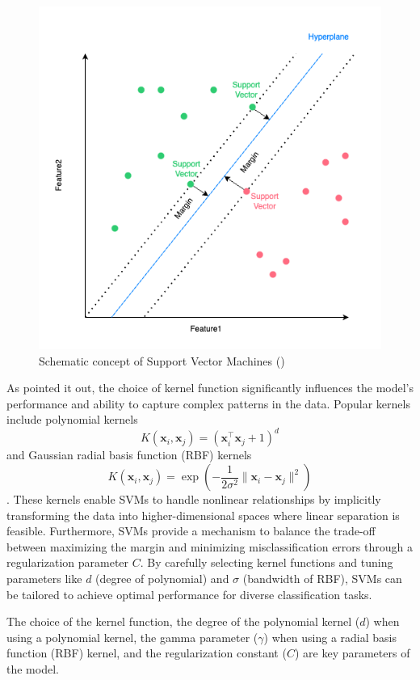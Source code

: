 \documentclass[aodsor,preprint]{imsart}
\numberwithin{equation}{section}
\theoremstyle{plain}
\begin{document}
\begin{figure}[H]
  \centering
  \includegraphics[width=\textwidth]{plots/svm.png}
  \caption{Schematic concept of Support Vector Machines (\cite{james2023})}
  \label{fig:plotsvm}
\end{figure}

As \cite{huang2005} pointed it out, the choice of kernel function significantly influences the model's performance and ability to capture complex patterns in the data. Popular kernels include polynomial kernels $$K(\mathbf{x}_i, \mathbf{x}_j) = (\mathbf{x}_i^\top \mathbf{x}_j + 1)^d$$ and Gaussian radial basis function (RBF) kernels $$K(\mathbf{x}_i, \mathbf{x}_j) = \exp\left(-\frac{1}{2\sigma^2} \| \mathbf{x}_i - \mathbf{x}_j \|^2 \right)$$. These kernels enable SVMs to handle nonlinear relationships by implicitly transforming the data into higher-dimensional spaces where linear separation is feasible. Furthermore, SVMs provide a mechanism to balance the trade-off between maximizing the margin and minimizing misclassification errors through a regularization parameter $C$. By carefully selecting kernel functions and tuning parameters like $d$ (degree of polynomial) and $\sigma$ (bandwidth of RBF), SVMs can be tailored to achieve optimal performance for diverse classification tasks.

The choice of the kernel function, the degree of the polynomial kernel ($d$) when using a polynomial kernel, the gamma parameter ($\gamma$) when using a radial basis function (RBF) kernel, and the regularization constant ($C$) are key parameters of the model.
\end{document}
